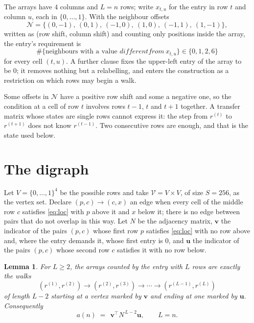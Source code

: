\documentclass[11pt,a4paper]{article}
\theoremstyle{plain}
\newtheorem{lemma}[theorem]{Lemma}
\theoremstyle{definition}
\begin{document}
The arrays have $4$ columns and $L=n$ rows; write $x_{t,u}$ for the entry in
row $t$ and column $u$, each in $\{0,\dots,1\}$. With the neighbour offsets
\[
\mathcal N=\{(0,-1),\ (0,1),\ (-1,0),\ (1,0),\ (-1,1),\ (1,-1)\},
\]
written as (row shift, column shift) and counting only positions inside the array, the
entry's requirement is
\begin{equation}\label{eq:loc}
\#\{\text{neighbours with a value }different from\ x_{t,u}\}\in\{0,1,2,6\}
\end{equation}
for every cell $(t,u)$. A further clause fixes the upper-left entry of the array to be $0$; it removes nothing but a relabelling, and enters the construction as a restriction on which rows may begin a walk.

Some offsets in $\mathcal N$ have a positive row shift and some a negative one, so the
condition at a cell of row $t$ involves rows $t-1$, $t$ and $t+1$ together. A transfer
matrix whose states are single rows cannot express it: the step from $r^{(t)}$ to
$r^{(t+1)}$ does not know $r^{(t-1)}$. Two consecutive rows are enough, and that is
the state used below.

\section{The digraph}

Let $V=\{0,\dots,1\}^{4}$ be the possible rows and take
$\mathcal V=V\times V$, of size $S=256$, as the vertex set. Declare $(p,c)\to(c,x)$ an edge
when every cell of the middle row $c$ satisfies \eqref{eq:loc} with $p$ above it and $x$
below it; there is no edge between pairs that do not overlap in this way. Let $N$ be the
adjacency matrix, $\mathbf{v}$ the indicator of the pairs $(p,c)$ whose first row $p$
satisfies \eqref{eq:loc} with no row above and, where the entry demands it, whose first entry is $0$, and $\mathbf{u}$ the indicator of
the pairs $(p,c)$ whose second row $c$ satisfies it with no row below.

\begin{lemma}\label{lem:walk}
For $L\ge2$, the arrays counted by the entry with $L$ rows are exactly the walks
\[
(r^{(1)},r^{(2)})\to(r^{(2)},r^{(3)})\to\cdots\to(r^{(L-1)},r^{(L)})
\]
of length $L-2$ starting at a vertex marked by $\mathbf{v}$ and ending at one marked by
$\mathbf{u}$. Consequently
\[
a(n)\;=\;\,\mathbf{v}^{\!\top}N^{\,L-2}\mathbf{u},\qquad L=n .
\]
\end{lemma}
\end{document}
